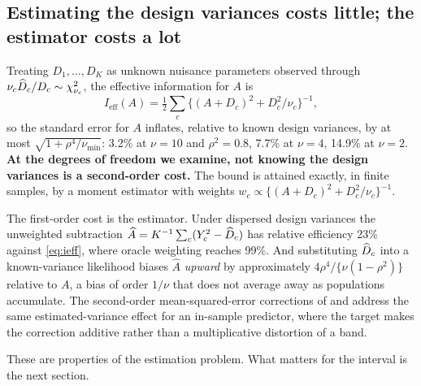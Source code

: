 \subsection{Estimating the design variances costs little; the estimator costs a lot}

Treating $D_1,\dots,D_K$ as unknown nuisance parameters observed through
$\nu_c\widehat D_c/D_c\sim\chi^2_{\nu_c}$, the effective information for $A$ is
\begin{equation}\label{eq:ieff}
I_{\mathrm{eff}}(A)=\tfrac12\sum_c\big\{(A+D_c)^2+D_c^2/\nu_c\big\}^{-1},
\end{equation}
so the standard error for $A$ inflates, relative to known design variances, by at
most $\sqrt{1+\rho^4/\nu_{\min}}$: 3.2\% at $\nu=10$ and $\rho^2=0.8$, 7.7\% at
$\nu=4$, 14.9\% at $\nu=2$. \textbf{At the degrees of freedom we examine, not
knowing the design variances is a second-order cost.} The bound is attained
exactly, in finite samples, by a moment estimator with weights
$w_c\propto\{(A+D_c)^2+D_c^2/\nu_c\}^{-1}$.

The first-order cost is the estimator. Under dispersed design variances the
unweighted subtraction $\widehat A=K^{-1}\sum_c(Y_c^2-\widehat D_c)$ has relative
efficiency 23\% against \eqref{eq:ieff}, where oracle weighting reaches 99\%. And
substituting $\widehat D_c$ into a known-variance likelihood biases $\widehat A$
\emph{upward} by approximately $4\rho^4/\{\nu(1-\rho^2)\}$ relative to $A$, a
bias of order $1/\nu$ that does not average away as populations accumulate. The
second-order mean-squared-error corrections of \citet{prasad1990} and
\citet{datta2000} address the same estimated-variance effect for an in-sample
predictor, where the target makes the correction additive rather than a
multiplicative distortion of a band.

These are properties of the estimation problem. What matters for the interval is
the next section.
